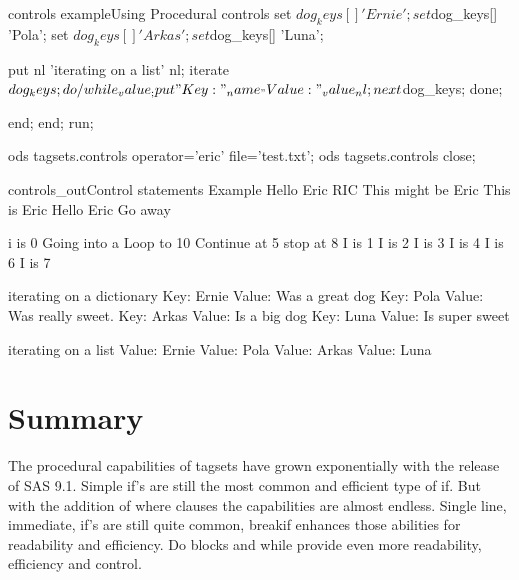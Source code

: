 \begin{fvcode}{controls example}{Using Procedural controls}
            set $dog_keys[] 'Ernie';
            set $dog_keys[] 'Pola';
            set $dog_keys[] 'Arkas';
            set $dog_keys[] 'Luna';
      
            put nl 'iterating on a list' nl;
            iterate $dog_keys;
            do /while _value_;
                put "Key: " _name_ " Value: " _value_ nl;
                next $dog_keys;
            done;

        end;
    end;
run;

ods tagsets.controls operator='eric' file='test.txt';
ods tagsets.controls close;
      
\end{fvcode}


\begin{poutput}{controls_out}{Control statements Example}
Hello Eric
RIC
This might be Eric
This is Eric
Hello Eric
Go away

i is 0
Going into a Loop to 10
Continue at 5
stop at 8
I is 1
I is 2
I is 3
I is 4
I is 6
I is 7

iterating on a dictionary
Key: Ernie Value: Was a great dog
Key: Pola Value: Was really sweet.
Key: Arkas Value: Is a big dog
Key: Luna Value: Is super sweet

iterating on a list
 Value: Ernie
 Value: Pola
 Value: Arkas
 Value: Luna
\end{poutput}

\section{Summary}
The procedural capabilities of tagsets have grown exponentially
with the release of SAS 9.1.  Simple if's are still the most common
and efficient type of if.  But with the addition of where clauses the
capabilities are almost endless.
Single line, immediate, if's are still quite common, breakif enhances 
those abilities for readability and efficiency.  
Do blocks and while provide even more readability, efficiency and control.

